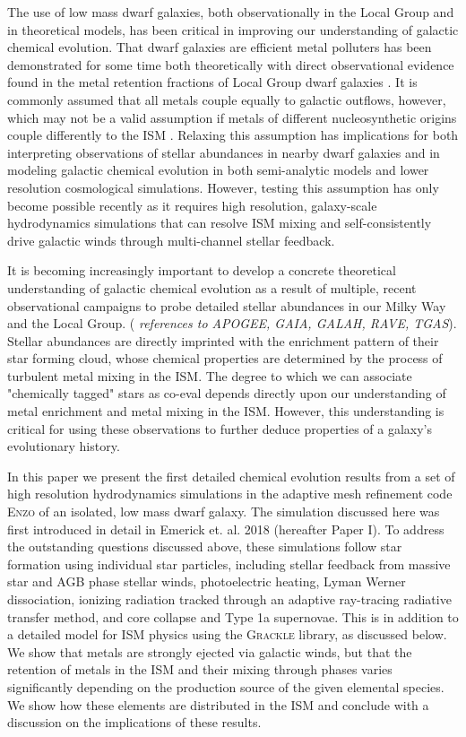 \documentclass[twocolumn]{aastex61}
\begin{document}
The use of low mass dwarf galaxies, both observationally in the Local Group and in theoretical models, has been critical in improving our understanding of galactic chemical evolution. That dwarf galaxies are efficient metal polluters has been demonstrated for some time both theoretically \citep[e.g.][]{DekelSilk1986,MacLowFerrara1999} with direct observational evidence found in the metal retention fractions of Local Group dwarf galaxies \citep[e.g.][]{Kirby2011-metals,McQuinn2015}. It is commonly assumed that all metals couple equally to galactic outflows, however, which may not be a valid assumption if metals of different nucleosynthetic origins couple differently to the ISM \citep{KrumholzTing2018}. Relaxing this assumption has implications for both interpreting observations of stellar abundances in nearby dwarf galaxies and in modeling galactic chemical evolution in both semi-analytic models and lower resolution cosmological simulations. However, testing this assumption has only become possible recently as it requires high resolution, galaxy-scale hydrodynamics simulations that can resolve ISM mixing and self-consistently drive galactic winds through multi-channel stellar feedback. 

It is becoming increasingly important to develop a concrete theoretical understanding of galactic chemical evolution as a result of multiple, recent observational campaigns to probe detailed stellar abundances in our Milky Way and the Local Group. (\textit{ references to APOGEE, GAIA, GALAH, RAVE, TGAS}). Stellar abundances are directly imprinted with the enrichment pattern of their star forming cloud, whose chemical properties are determined by the process of turbulent metal mixing in the ISM. The degree to which we can associate "chemically tagged" stars as co-eval depends directly upon our understanding of metal enrichment and metal mixing in the ISM. However, this understanding is critical for using these observations to further deduce properties of a galaxy's evolutionary history.

In this paper we present the first detailed chemical evolution results from a set of high resolution hydrodynamics simulations in the adaptive mesh refinement code \textsc{Enzo} \citep{Enzo2014} of an isolated, low mass dwarf galaxy. The simulation discussed here was first introduced in detail in Emerick et. al. 2018 (hereafter Paper I). To address the outstanding questions discussed above, these simulations follow star formation using individual star particles, including stellar feedback from massive star and AGB phase stellar winds, photoelectric heating, Lyman Werner dissociation, ionizing radiation tracked through an adaptive ray-tracing radiative transfer method, and core collapse and Type 1a supernovae. This is in addition to a detailed model for ISM physics using the \textsc{Grackle} library, as discussed below. We show that metals are strongly ejected via galactic winds, but that the retention of metals in the ISM and their mixing through phases varies significantly depending on the production source of the given elemental species. We show how these elements are distributed in the ISM and conclude with a discussion on the implications of these results.
\end{document}
